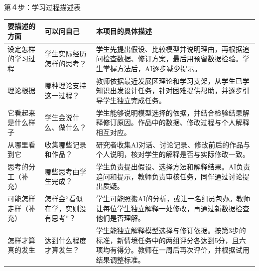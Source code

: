 \documentclass[UTF8,a4paper,11pt,fontset=windows]{ctexart}
\newcommand{\step}[1]{\par\addvspace{5pt}
  {\sffamily\fontsize{13pt}{18pt}\selectfont #1}\par\nobreak\vspace{7pt}}
\begin{document}
\newpage
\step{第４步：学习过程描述表}
\begingroup
\fontsize{10pt}{14.5pt}\selectfont
\setlength{\tabcolsep}{6pt}
\begin{tabularx}{\textwidth}{|P{2.6cm}|P{3.3cm}|Y|}
\hline
{}
\textbf{要描述的方面} & \textbf{可以问自己} & \textbf{本项目的具体描述}\\[4pt]\hline
设定怎样的学习过程
& 学生实际经历怎样的思考？
& 学生先提出假设、比较模型并说明理由，再根据追问检查数据、修订方案，最后用预留数据检验。学生掌握方法后，AI逐步减少提示。\\[7pt]\hline
理论根据
& 哪种理论支持这一过程？
& 教师依据最近发展区理论和学习支架，从学生已学知识出发设计任务，针对困难提供帮助，并逐步引导学生独立完成任务\cite{vygotsky1978,wood1976}。\\[7pt]\hline
它看起来是什么样子
& 学生会说什么、做什么？
& 学生能够说明模型选择的依据，并结合检验结果解释修订原因。作品中的数据、修改过程与个人解释相互对应。\\[7pt]\hline
从哪里看到它
& 收集哪些记录和作品？
& 研究者收集AI对话、讨论记录、修改前后的作品与个人说明，核对学生的解释是否与实际修改一致。\\[7pt]\hline
思考的分工（补充）
& 哪些思考由学生完成？
& 学生负责提出假设、选择方法和解释结果。AI负责追问和提示，教师负责审核任务，同伴通过讨论提出质疑。\\[7pt]\hline
可能怎样走样（补充）
& 怎样会“看似在学，实则没有思考”？
& 学生可能照搬AI的分析，或让一名组员包办。教师让每位学生独立解释一处修改，再通过新数据检查他们是否理解。\\[7pt]\hline
怎样才算真的发生
& 达到什么程度才算发生？
& 学生能独立解释模型选择与修订依据。按第3步的标准，新情境任务中的两组评分各达到5分，且六项均有得分。教师在一周后再次评价，并根据试用结果调整标准。\\[7pt]\hline
\end{tabularx}
\endgroup
\end{document}

